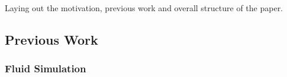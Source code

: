 \chapter{\bevezetes}

Laying out the motivation, previous work and overall structure of the paper.


\section{Previous Work}
\subsection{Fluid Simulation}

